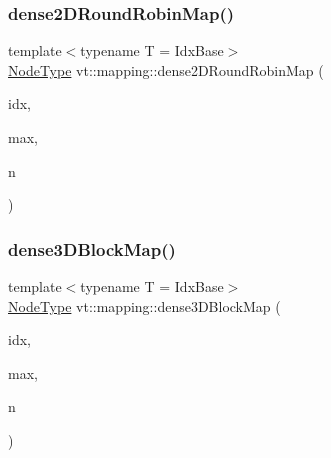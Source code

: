 \mbox{\label{namespacevt_1_1mapping_ac606a5886c93a4dbb05dfead285c30c6}} 
\subsubsection{\texorpdfstring{dense2\+D\+Round\+Robin\+Map()}{dense2DRoundRobinMap()}}
{\footnotesize\ttfamily template$<$typename T  = Idx\+Base$>$ \\
\hyperlink{namespacevt_a866da9d0efc19c0a1ce79e9e492f47e2}{Node\+Type} vt\+::mapping\+::dense2\+D\+Round\+Robin\+Map (\begin{DoxyParamCaption}\item[{\hyperlink{namespacevt_1_1mapping_a6832cbb1361fe72fd7ec730e7b7773b3}{Idx2\+D\+Ptr}$<$ T $>$}]{idx,  }\item[{\hyperlink{namespacevt_1_1mapping_a6832cbb1361fe72fd7ec730e7b7773b3}{Idx2\+D\+Ptr}$<$ T $>$}]{max,  }\item[{\hyperlink{namespacevt_a866da9d0efc19c0a1ce79e9e492f47e2}{Node\+Type}}]{n }\end{DoxyParamCaption})}

\mbox{\label{namespacevt_1_1mapping_a91764d84e5e6d8253872740cb8424726}} 
\subsubsection{\texorpdfstring{dense3\+D\+Block\+Map()}{dense3DBlockMap()}}
{\footnotesize\ttfamily template$<$typename T  = Idx\+Base$>$ \\
\hyperlink{namespacevt_a866da9d0efc19c0a1ce79e9e492f47e2}{Node\+Type} vt\+::mapping\+::dense3\+D\+Block\+Map (\begin{DoxyParamCaption}\item[{\hyperlink{namespacevt_1_1mapping_aacc737158b6517f2d760ffc8d1b5abca}{Idx3\+D\+Ptr}$<$ T $>$}]{idx,  }\item[{\hyperlink{namespacevt_1_1mapping_aacc737158b6517f2d760ffc8d1b5abca}{Idx3\+D\+Ptr}$<$ T $>$}]{max,  }\item[{\hyperlink{namespacevt_a866da9d0efc19c0a1ce79e9e492f47e2}{Node\+Type}}]{n }\end{DoxyParamCaption})}

